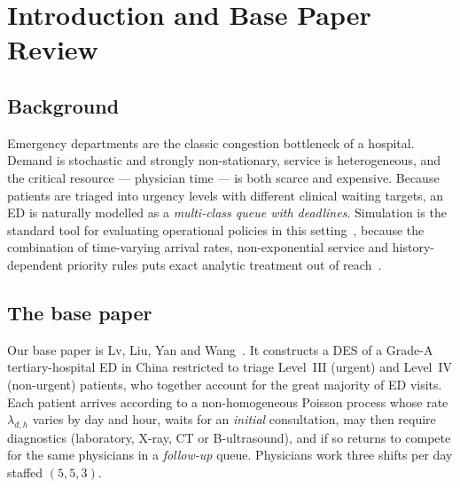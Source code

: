 \documentclass[sigconf,nonacm]{acmart}
\begin{document}


\maketitle

\section{Introduction and Base Paper Review}

\subsection{Background}
Emergency departments are the classic congestion bottleneck of a hospital.
Demand is stochastic and strongly non-stationary, service is heterogeneous, and
the critical resource --- physician time --- is both scarce and expensive.
Because patients are triaged into urgency levels with different clinical
waiting targets, an ED is naturally modelled as a \emph{multi-class queue with
deadlines}. Simulation is the standard tool for evaluating operational policies
in this setting~\cite{vanbrabant2019kpi,wang2023simopt}, because the
combination of time-varying arrival rates, non-exponential service and
history-dependent priority rules puts exact analytic treatment out of
reach~\cite{huang2015control}.

\subsection{The base paper}
Our base paper is Lv, Liu, Yan and Wang~\cite{lv2026des}. It constructs a DES of
a Grade-A tertiary-hospital ED in China restricted to triage Level~III (urgent)
and Level~IV (non-urgent) patients, who together account for the great majority
of ED visits. Each patient arrives according to a non-homogeneous Poisson
process whose rate $\lambda_{d,h}$ varies by day and hour, waits for an
\emph{initial} consultation, may then require diagnostics (laboratory, X-ray,
CT or B-ultrasound), and if so returns to compete for the same physicians in a
\emph{follow-up} queue. Physicians work three shifts per day staffed
$(5,5,3)$.
\end{document}
